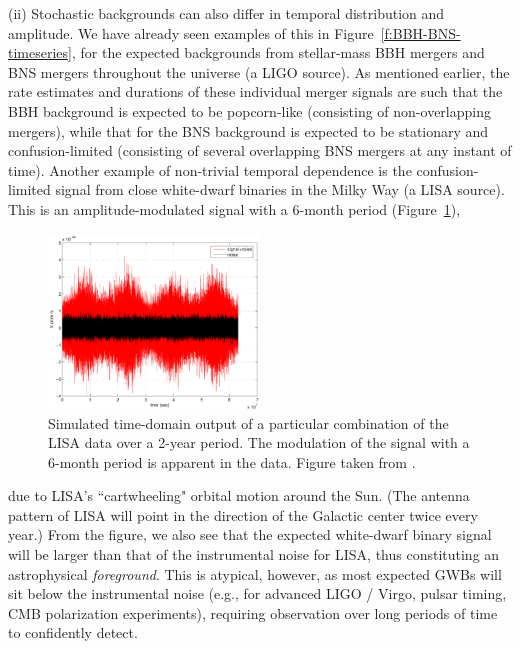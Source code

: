 \documentclass[11pt]{article}
\numberwithin{equation}{section}
\begin{document}
(ii) Stochastic backgrounds can also differ in 
temporal distribution and amplitude.
We have already seen examples of this in 
Figure~\ref{f:BBH-BNS-timeseries}, for the expected
backgrounds from stellar-mass BBH mergers and 
BNS mergers throughout the universe (a LIGO source).
As mentioned earlier, the rate estimates and 
durations of these individual merger signals are such 
that the BBH background is expected to be popcorn-like 
(consisting of non-overlapping mergers), 
while that for the BNS background is expected to be
stationary and confusion-limited 
(consisting of several overlapping BNS mergers at any
instant of time).
Another example of non-trivial temporal dependence
is the confusion-limited signal from close 
white-dwarf binaries in the Milky Way (a LISA source).
This is an amplitude-modulated signal with 
a 6-month period (Figure~\ref{f:cyclostationary_data}), 
%
\begin{figure}[htbp!]
\begin{center}
\includegraphics[width=0.5\textwidth]{Figures/cyclostationary_data}
\caption{Simulated time-domain output of a particular 
combination of the LISA data over a 2-year period.
The modulation of the signal with a 6-month period
is apparent in the data.
Figure taken from \cite{Romano-Cornish:2017}.}
\label{f:cyclostationary_data}
\end{center}
\end{figure}
%
due to LISA's ``cartwheeling" orbital motion around 
the Sun.
(The antenna pattern of LISA will point in the direction
of the Galactic center twice every year.) 
From the figure, we also see that the expected 
white-dwarf binary signal will be larger than that 
of the instrumental noise for LISA, thus constituting 
an astrophysical {\em foreground}.
This is atypical, however, as most expected GWBs will sit 
below the instrumental noise (e.g., for advanced LIGO / Virgo,
pulsar timing, CMB polarization experiments), requiring 
observation over long periods of time to confidently detect.
\end{document}
